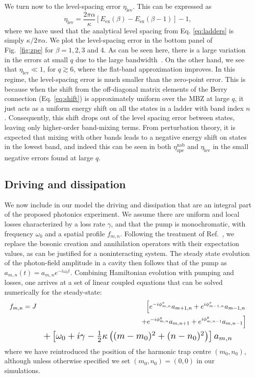 \documentclass[twocolumn, 10pt, aps, superscriptaddress, floatfix, showpacs, pra, citeautoscript]{revtex4-1}
\begin{document}
We turn now to the level-spacing error $\eta_{\text{lev}}$. This can be expressed as 
\begin{equation}
\eta_{\text{lev}} = \frac{2\pi \alpha}{\kappa} [E_{\text{ex}}(\beta)
- E_{\text{ex}}(\beta - 1)] -1, 
\end{equation}
where we have used that the analytical level spacing from Eq. \ref{eq:ladders} is simply $\kappa / 2\pi \alpha$. 
We plot the level-spacing error in the bottom panel of Fig.~\ref{fig:zpe} for $\beta = 1, 2, 3$ and 4. As can be seen here, there is a large variation in the errors at small $q$ due to the large bandwidth~\cite{ozawa2014momhh}. On the other hand, we see that $\eta_{\text{lev}} \ll 1$, for $q \gtrsim 6$, where the flat-band approximation improves. In this regime, the level-spacing error is much smaller than the zero-point error. This is because when the shift from the off-diagonal matrix elements of the Berry connection (Eq. \ref{eq:shift}) is approximately uniform over the MBZ at large $q$, it just acts as a uniform energy shift on all the states in a  ladder with band index $n$. Consequently, this shift drops out of the level spacing error between states, leaving only higher-order band-mixing terms. From perturbation theory, it is expected that mixing with other bands leads to a negative energy shift on states in the lowest band, and indeed this can be seen in both $\eta_{\text{zpe}}^{\text{nab}}$ and $\eta_{\text{lev}}$ in the small negative errors found at large $q$. 

\subsection{Driving and dissipation}\label{sec:driven-dissipation}

We now include in our model the driving and dissipation that are an integral part of the proposed photonics experiment. We assume there are uniform and local losses
characterized by a loss rate $\gamma$, and that the pump is
monochromatic, with frequency $\omega_0$ and a spatial profile
$f_{m,n}$. Following the treatment of Ref.~, we replace the bosonic creation and annihilation operators with their expectation
values, as can be justified for a noninteracting system. The steady state evolution of the photon-field amplitude in a cavity then follows that of
the pump as $a_{m,n}(t) = a_{m,n} e^{-i \omega_0 t}$. Combining Hamiltonian evolution with pumping and losses, one arrives at a set of linear coupled equations that can be solved numerically for the steady-state\cite{cohen1992atom}:
%
\begin{eqnarray}\label{eq:linear_problem}
f_{m,n} =J&&\left[e^{-i\phi_{m,n}^x}a_{m+1,n}+e^{i\phi_{m-1,n}^x}a_{m-1,n} \right. \nonumber\\ &&\left. +e^{-i\phi_{m,n}^y}a_{m,n+1}+e^{i\phi_{m,n-1}^y}a_{m,n-1}\right] \nonumber\\
&&{\resizebox{.8\hsize}{!}{${+\left[\omega_{0}+i\gamma-\frac{1}{2}\kappa 
\left((m-m_0)^{2}+(n-n_0)^{2}\right)\right]a_{m,n}}$}} \qquad
\end{eqnarray}
where we have reintroduced the position of the harmonic trap centre $(m_0, n_0)$, although unless otherwise specified we set $(m_0, n_0)=(0,0)$ in our simulations.
\end{document}
